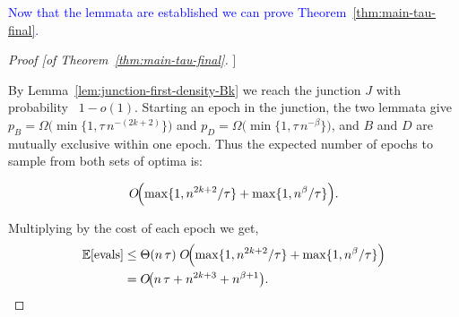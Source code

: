 \textcolor{blue}{
	Now that the lemmata are established we can prove Theorem~\ref{thm:main-tau-final}.
	}
\begin{proof}[Proof [of Theorem~\ref{thm:main-tau-final}]]
	
	By Lemma~\ref{lem:junction-first-density-Bk} we reach the junction $J$ with probability \ \(1-o(1)\).
	Starting an epoch in the junction, %
	the two lemmata give
	$p_B=\Omega\!\bigl(\min\{1,\tau\,n^{-(2k+2)}\}\bigr)$ and
	$p_D=\Omega\!\bigl(\min\{1,\tau\,n^{-\beta}\}\bigr)$,
	and \(B\) and \(D\) are mutually exclusive within one epoch. Thus the expected number of epochs to sample from both sets of optima is:
	
	\[
	O\!\Bigl(
	\max\{1,n^{2k+2}/\tau\}
	+\max\{1,n^{\beta}/\tau\}
	\Bigr).
	\]
	
	Multiplying by the cost of each epoch we get,
	\begin{align*}
		\mathbb{E}[\text{evals}]
		&\le
		\Theta(n\,\tau)\;
		O\!\Bigl(
		\max\{1,n^{2k+2}/\tau\}
		+\max\{1,n^{\beta}/\tau\}
		\Bigr)
		\\&=
		O\!\bigl(
		n\,\tau
		+n^{2k+3}
		+n^{\beta+1}
		\bigr).
	\end{align*}
\end{proof}

